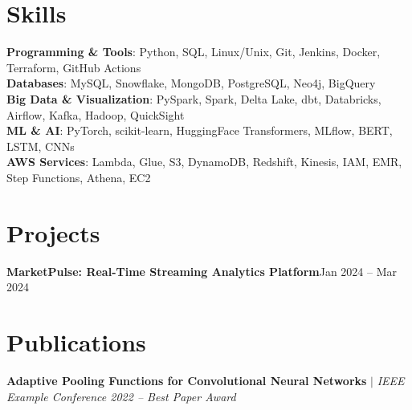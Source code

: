 \section{Skills}
 \begin{itemize}[leftmargin=0.15in, label={}]
    \small{\item{
     \textbf{Programming \& Tools}{: Python, SQL, Linux/Unix, Git, Jenkins, Docker, Terraform, GitHub Actions} \\
     \textbf{Databases}{: MySQL, Snowflake, MongoDB, PostgreSQL, Neo4j, BigQuery} \\
     \textbf{Big Data \& Visualization}{: PySpark, Spark, Delta Lake, dbt, Databricks, Airflow, Kafka, Hadoop, QuickSight} \\
     \textbf{ML \& AI}{: PyTorch, scikit-learn, HuggingFace Transformers, MLflow, BERT, LSTM, CNNs} \\
     \textbf{AWS Services}{: Lambda, Glue, S3, DynamoDB, Redshift, Kinesis, IAM, EMR, Step Functions, Athena, EC2}
    }}
 \end{itemize}

\section{Projects}
    \resumeSubHeadingListStart
      \resumeProjectHeading
          {\textbf{MarketPulse: Real-Time Streaming Analytics Platform}}{Jan 2024 -- Mar 2024}
          \resumeItemListStart
          \resumeItemListEnd
    \resumeSubHeadingListEnd

\section{Publications}
    \resumeSubHeadingListStart
      \resumeProjectHeading
          {\textbf{Adaptive Pooling Functions for Convolutional Neural Networks} $|$ \emph{IEEE Example Conference 2022 -- Best Paper Award}}{}
          \resumeItemListStart
          \resumeItemListEnd
    \resumeSubHeadingListEnd

